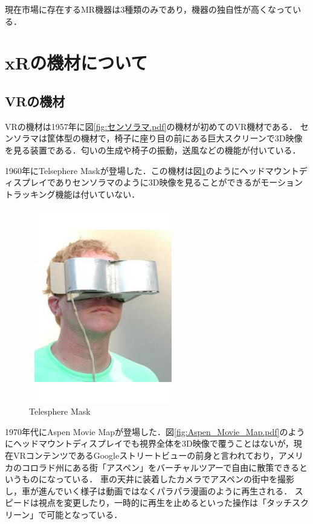 \documentclass[12pt,a4j]{ltjsarticle}
\begin{document}
現在市場に存在するMR機器は3種類のみであり，機器の独自性が高くなっている．

\clearpage
\section{xRの機材について}
\subsection{VRの機材}
VRの機材は1957年に図\ref{fig:センソラマ.pdf}の機材が初めてのVR機材である．
センソラマは筐体型の機材で，椅子に座り目の前にある巨大スクリーンで3D映像を見る装置である．匂いの生成や椅子の振動，送風などの機能が付いている\cite{VRの機材}．

1960年にTelsephere Maskが登場した．この機材は図\ref{fig:Telesphere_Mask.pdf}のようにヘッドマウントディスプレイでありセンソラマのように3D映像を見ることができるがモーショントラッキング機能は付いていない．

\begin{figure}[h]
\begin{center}
 \includegraphics[clip,width=65mm,height=85mm]{Telesphere_Mask.pdf}
\end{center}
 \caption{Telesphere Mask}
 \label{fig:Telesphere_Mask.pdf}
\end{figure}

1970年代にAspen Movie Mapが登場した．図\ref{fig:Aspen_Movie_Map.pdf}のようにヘッドマウントディスプレイでも視界全体を3D映像で覆うことはないが，現在VRコンテンツであるGoogleストリートビューの前身と言われており，アメリカのコロラド州にある街「アスペン」をバーチャルツアーで自由に散策できるというものになっている．
車の天井に装着したカメラでアスペンの街中を撮影し，車が進んでいく様子は動画ではなくパラパラ漫画のように再生される．
スピードは視点を変更したり，一時的に再生を止めるといった操作は「タッチスクリーン」で可能となっている\cite{VRの機材}．
\end{document}
